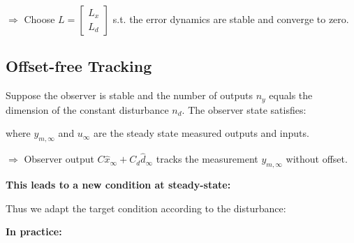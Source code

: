 \documentclass[8pt,a4paper]{scrartcl}
\begin{document}
\begin{multicols*}{3}
$\Rightarrow$ Choose $L=\begin{bmatrix}L_x\\L_d\end{bmatrix}$ s.t. the error dynamics are stable and converge to zero.

\subsection{Offset-free Tracking}

Suppose the observer is stable and the number of outputs $n_y$ equals the dimension of the constant disturbance $n_d$. The observer state satisfies:


where $y_{m,\infty}$ and $u_\infty$ are the steady state measured outputs and inputs.

$\Rightarrow$ Observer output $C\hat{x}_\infty+C_d\hat{d}_\infty$ tracks the measurement $y_{m,\infty}$ without offset.

\finn

\textbf{This leads to a new condition at steady-state:}


Thus we adapt the target condition according to the disturbance:


\textbf{In practice:}


\end{multicols*}
\end{document}
